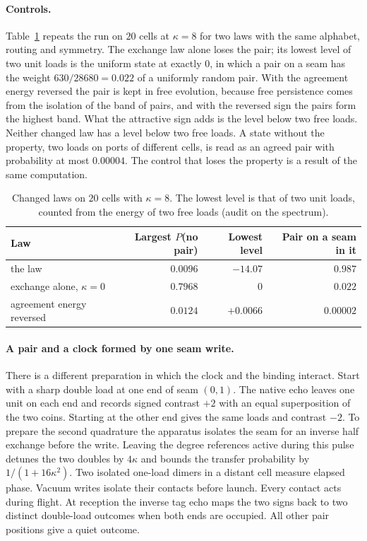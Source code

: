 \paragraph{Controls.}
Table~\ref{tab:cms-controls} repeats the run on $20$ cells at $\kappa=8$ for two laws with
the same alphabet, routing and symmetry. The exchange law alone loses the pair; its lowest
level of two unit loads is the uniform state at exactly $0$, in which a pair on a seam has
the weight $630/28680=0.022$ of a uniformly random pair. With the agreement energy reversed
the pair is kept in free evolution, because free persistence comes from the isolation of
the band of pairs, and with the reversed sign the pairs form the highest band. What the
attractive sign adds is the level below two free loads. Neither changed law has a level
below two free loads. A state without the property, two loads on ports of different cells,
is read as an agreed pair with probability at most $0.00004$. The control that loses the
property is a result of the same computation.

\begin{table}[htbp]
\centering\small
\caption{Changed laws on $20$ cells with $\kappa=8$. The lowest level is that of two unit
loads, counted from the energy of two free loads (audit on the spectrum).}
\label{tab:cms-controls}
\begin{tabular}{@{}lrrr@{}}
\toprule
Law & Largest $P$(no pair) & Lowest level & Pair on a seam in it\\
\midrule
the law & $0.0096$ & $-14.07$ & $0.987$\\
exchange alone, $\kappa=0$ & $0.7968$ & $0$ & $0.022$\\
agreement energy reversed & $0.0124$ & $+0.0066$ & $0.00002$\\
\bottomrule
\end{tabular}
\end{table}

\paragraph{A pair and a clock formed by one seam write.}
There is a different preparation in which the clock and the binding interact.
Start with a sharp double load at one end of seam $(0,1)$. The native echo
leaves one unit on each end and records signed contrast $+2$ with an equal
superposition of the two coins. Starting at the other end gives the same
loads and contrast $-2$. To prepare the second quadrature the apparatus
isolates the seam for an inverse half exchange before the write. Leaving
the degree references active during this pulse detunes the two doubles by
$4\kappa$ and bounds the transfer probability by $1/(1+16\kappa^2)$.
Two isolated one-load dimers in a distant
cell measure elapsed phase. Vacuum writes isolate their contacts before launch.
Every contact acts during flight. At reception the inverse tag echo maps the
two signs back to two distinct double-load outcomes when both ends are
occupied. All other pair positions give a quiet outcome.

